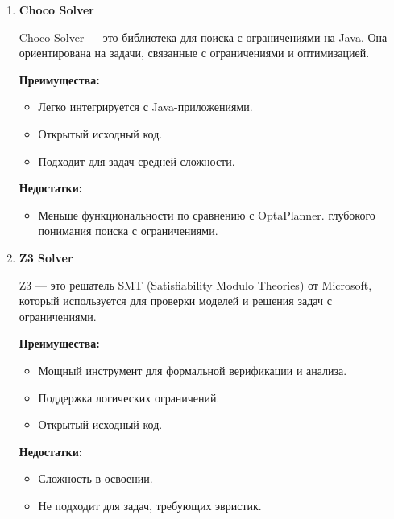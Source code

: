 \begin{enumerate}
\vspace{6mm}

 \item \noindent \textbf {Choco Solver}

 Choco Solver — это библиотека для поиска с ограничениями на Java. Она ориентирована на задачи, связанные с ограничениями и оптимизацией.
\vspace{6mm}

\noindent \textbf{Преимущества:}
\begin{itemize}
    \item Легко интегрируется с Java-приложениями.
    \item Открытый исходный код.
    \item Подходит для задач средней сложности.
\end{itemize}

\vspace{6mm}

\noindent \textbf{Недостатки:}
\begin{itemize}
\item Меньше функциональности по сравнению с OptaPlanner.
 глубокого понимания поиска с ограничениями.
\end{itemize}

\vspace{6mm}

\item \noindent \textbf {Z3 Solver}

  Z3 — это решатель SMT (Satisfiability Modulo Theories) от Microsoft, который используется для проверки моделей и решения задач с ограничениями.
\vspace{6mm}

\noindent \textbf{Преимущества:}
\begin{itemize}
    \item Мощный инструмент для формальной верификации и анализа.
    \item Поддержка логических ограничений.
    \item Открытый исходный код.
\end{itemize}

\vspace{6mm}

\noindent \textbf{Недостатки:}
\begin{itemize}
\item Сложность в освоении.
\item Не подходит для задач, требующих эвристик.
\end{itemize}


\end{enumerate}
